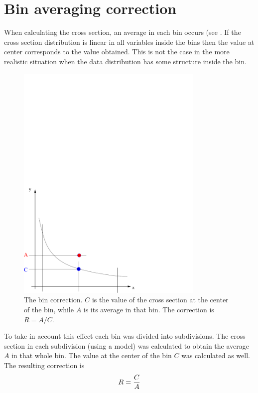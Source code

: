 \section{ Bin averaging correction}
When calculating the cross section, an average
in each bin occurs (see . If the cross section distribution
is linear in all variables inside the bins then the value
at center corresponds to the value obtained. This is not the case 
in the more realistic situation when the data distribution
has some structure inside the bin. 

\begin{figure}[h]
\begin{center}
 \includegraphics[width = 9cm, bb=-20 0 440 420]{analysis/img/bin}
  \caption[The bin correction]
          { The bin correction. $C$ is the value of the cross section at the center
	             of the bin, while $A$ is its average in that bin. The correction is $R=A/C$.}
 \label{fig:bin}
\end{center}
\end{figure}



To take in account this effect 
each bin was divided into subdivisions. The cross section
in each subdivision (using a model) was calculated to obtain the average $A$ in that 
whole bin. 
The value at the center of the bin $C$ was calculated as well. The resulting correction is
$$
 R = \frac{\displaystyle C}{\displaystyle A}
$$





